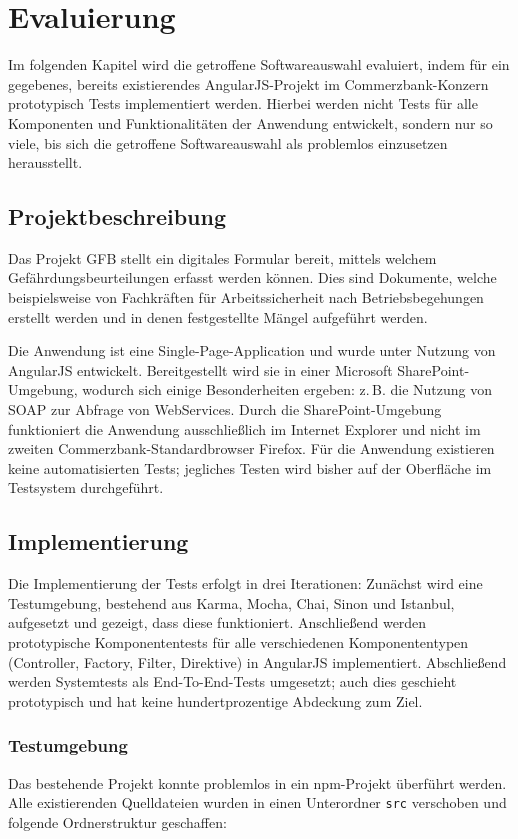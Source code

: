 \section{Evaluierung}
Im folgenden Kapitel wird die getroffene Softwareauswahl evaluiert, indem für ein gegebenes, bereits existierendes AngularJS-Projekt im Commerzbank-Konzern prototypisch Tests implementiert werden. Hierbei werden nicht Tests für alle Komponenten und Funktionalitäten der Anwendung entwickelt, sondern nur so viele, bis sich die getroffene Softwareauswahl als problemlos einzusetzen herausstellt.

\subsection{Projektbeschreibung}
Das Projekt GFB stellt ein digitales Formular bereit, mittels welchem Gefährdungsbeurteilungen erfasst werden können. Dies sind Dokumente, welche beispielsweise von Fachkräften für Arbeitssicherheit nach Betriebsbegehungen erstellt werden und in denen festgestellte Mängel aufgeführt werden. \cite{gfb}

Die Anwendung ist eine Single-Page-Application und wurde unter Nutzung von AngularJS entwickelt. Bereitgestellt wird sie in einer Microsoft SharePoint-Umgebung, wodurch sich einige Besonderheiten ergeben: z.\,B. die Nutzung von SOAP zur Abfrage von WebServices. Durch die SharePoint-Umgebung funktioniert die Anwendung ausschließlich im Internet Explorer und nicht im zweiten Commerzbank-Standardbrowser Firefox. Für die Anwendung existieren keine automatisierten Tests; jegliches Testen wird bisher auf der Oberfläche im Testsystem durchgeführt. \cite{gfb}

\subsection{Implementierung}
Die Implementierung der Tests erfolgt in drei Iterationen: Zunächst wird eine Testumgebung, bestehend aus Karma, Mocha, Chai, Sinon und Istanbul, aufgesetzt und gezeigt, dass diese funktioniert. Anschließend werden prototypische Komponententests für alle verschiedenen Komponententypen (Controller, Factory, Filter, Direktive) in AngularJS implementiert. Abschließend werden Systemtests als End-To-End-Tests umgesetzt; auch dies geschieht prototypisch und hat keine hundertprozentige Abdeckung zum Ziel.

\newpage
\subsubsection{Testumgebung}
Das bestehende Projekt konnte problemlos in ein npm-Projekt überführt werden. Alle existierenden Quelldateien wurden in einen Unterordner \texttt{src} verschoben und folgende Ordnerstruktur geschaffen:
\begin{figure}[H]
\end{figure}

